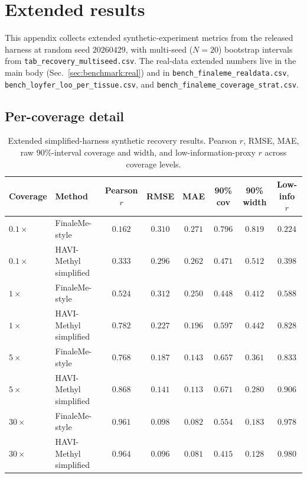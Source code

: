 \section{Extended results}
\label{app:extres}

This appendix collects extended synthetic-experiment metrics from the released harness at random seed $20260429$, with multi-seed ($N=20$) bootstrap intervals from \texttt{tab\_recovery\_multiseed.csv}. The real-data extended numbers live in the main body (Sec.~\ref{sec:benchmark:real}) and in \texttt{bench\_finaleme\_realdata.csv}, \texttt{bench\_loyfer\_loo\_per\_tissue.csv}, and \texttt{bench\_finaleme\_coverage\_strat.csv}.

\subsection*{Per-coverage detail}
\begin{table}[htbp]
\centering\small
\caption{Extended simplified-harness synthetic recovery results. Pearson $r$, RMSE, MAE, raw 90\%-interval coverage and width, and low-information-proxy $r$ across coverage levels.}
\label{tab:ext-recovery}
\begin{tabular}{llcccccc}
\toprule
Coverage & Method & Pearson $r$ & RMSE & MAE & 90\% cov & 90\% width & Low-info $r$ \\
\midrule
$0.1\times$ & FinaleMe-style & $0.162$ & $0.310$ & $0.271$ & $0.796$ & $0.819$ & $0.224$ \\
$0.1\times$ & HAVI-Methyl simplified & $0.333$ & $0.296$ & $0.262$ & $0.471$ & $0.512$ & $0.398$ \\
$1\times$ & FinaleMe-style & $0.524$ & $0.312$ & $0.250$ & $0.448$ & $0.412$ & $0.588$ \\
$1\times$ & HAVI-Methyl simplified & $0.782$ & $0.227$ & $0.196$ & $0.597$ & $0.442$ & $0.828$ \\
$5\times$ & FinaleMe-style & $0.768$ & $0.187$ & $0.143$ & $0.657$ & $0.361$ & $0.833$ \\
$5\times$ & HAVI-Methyl simplified & $0.868$ & $0.141$ & $0.113$ & $0.671$ & $0.280$ & $0.906$ \\
$30\times$ & FinaleMe-style & $0.961$ & $0.098$ & $0.082$ & $0.554$ & $0.183$ & $0.978$ \\
$30\times$ & HAVI-Methyl simplified & $0.964$ & $0.096$ & $0.081$ & $0.415$ & $0.128$ & $0.980$ \\
\bottomrule
\end{tabular}
\end{table}

